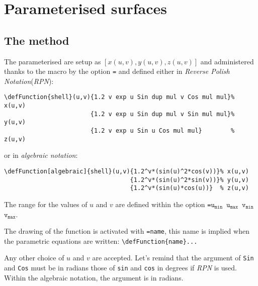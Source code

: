 \section{Parameterised surfaces}

\subsection{The method}

The parameterised  are setup as $[x(u,v),y(u,v),z(u,v)]$ and administered thanks to the macro  by the option
\texttt{=} and defined either in \textit{Reverse Polish Notation}(\textit{RPN}):


\begin{verbatim}
\defFunction{shell}(u,v){1.2 v exp u Sin dup mul v Cos mul mul}% x(u,v)
                        {1.2 v exp u Sin dup mul v Sin mul mul}% y(u,v)
                        {1.2 v exp u Sin u Cos mul mul}        % z(u,v)
\end{verbatim}

or in \textit{algebraic notation}:

\begin{verbatim}
\defFunction[algebraic]{shell}(u,v){1.2^v*(sin(u)^2*cos(v))}% x(u,v)
                                   {1.2^v*(sin(u)^2*sin(v))}% y(u,v)
                                   {1.2^v*(sin(u)*cos(u))}  % z(u,v)
\end{verbatim}

The range for the values of $u$ and $v$ are defined within the option
\texttt{=$\mathtt{u_{min}}$ $\mathtt{u_{max}}$ $\mathtt{v_{min}}$ %
$\mathtt{v_{max}}$}.

The drawing of the function is activated with
\texttt{=name}, this name is implied when the parametric equations are written:
\verb+\defFunction{name}...+

Any other choice of $u$ and $v$ are accepted. Let's remind that the argument of
\texttt{Sin} and \texttt{Cos} must be in radians those of \texttt{sin} and
\texttt{cos} in degrees if \textit{RPN} is  used. Within the algebraic notation, the argument is in radians.


